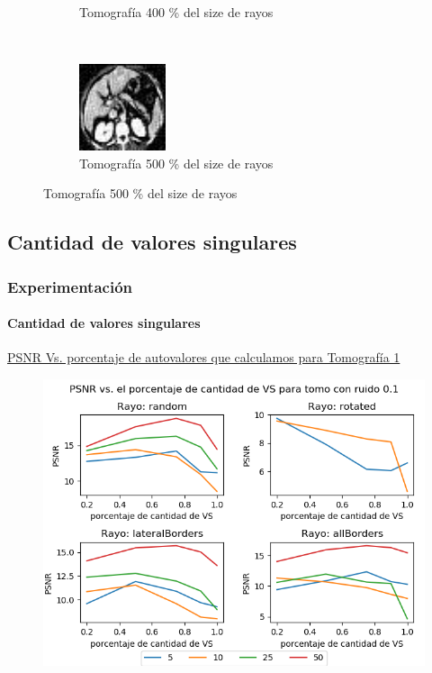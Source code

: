 \documentclass{beamer}
\begin{document}
\begin{frame}
\begin{figure}[H]
\begin{subfigure}[t]{0.3\textwidth}
          \caption{Tomografía 400 \% del size de  rayos}
      \end{subfigure}
      ~ 
      \begin{subfigure}[t]{0.3\textwidth}
          \centering
          \includegraphics[height=1.0in]{imagenes/ray_n/5.png}
          \caption{Tomografía 500 \% del size de rayos}
      \end{subfigure}
  \end{figure}
\end{frame}

\subsection{Cantidad de valores singulares}

\begin{frame}
\frametitle{Experimentación}
\framesubtitle{Cantidad de valores singulares}
\underline{PSNR Vs. porcentaje de autovalores que calculamos para Tomografía 1}
\begin{figure}[H]
  \centering
  \includegraphics[height=0.75\textheight]{../graficos/eigens/tomo/noise_graph_2.png}
\end{figure}
\end{frame}
\end{document}
